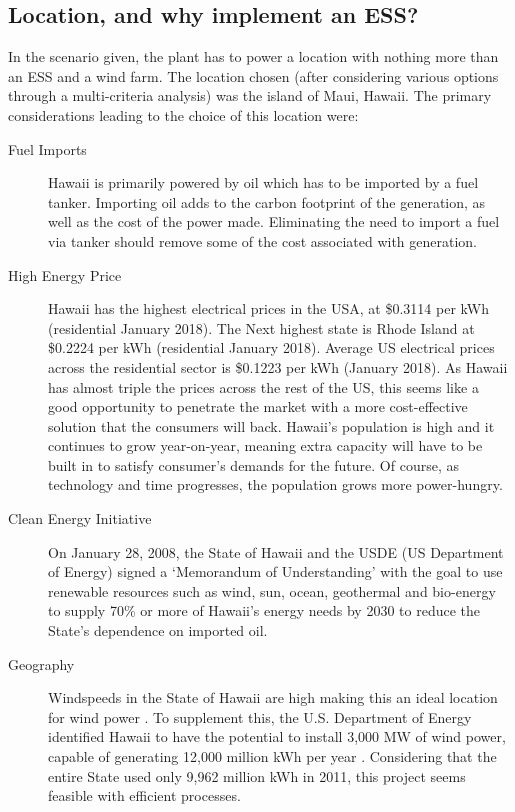 \subsection{Location, and why implement an ESS?}
In the scenario given, the plant has to power a location with nothing more than an ESS and a wind farm.
The location chosen (after considering various options through a multi-criteria analysis) was the island of Maui, Hawaii.
The primary considerations leading to the choice of this location were:
\begin{description}
        \item[Fuel Imports]{Hawaii is primarily powered by oil \cite{intro:oilimport} which has to be imported by a fuel tanker. Importing oil adds to the carbon footprint of the generation, as well as the cost of the power made. Eliminating the need to import a fuel via tanker should remove some of the cost associated with generation.}
        \item[High Energy Price]{Hawaii has the highest electrical prices in the USA, at \$0.3114 per kWh (residential January 2018)\cite{intro:price}. The Next highest state is Rhode Island at \$0.2224 per kWh (residential January 2018)\cite{intro:price}. Average US electrical prices across the residential sector is \$0.1223 per kWh (January 2018)\cite{intro:price}. As Hawaii has almost triple the prices across the rest of the US, this seems like a good opportunity to penetrate the market with a more cost-effective solution that the consumers will back.
Hawaii's population is high and it continues to grow year-on-year, meaning extra capacity will have to be built in to satisfy consumer's demands for the future. Of course, as technology and time progresses, the population grows more power-hungry.}
        \item[Clean Energy Initiative]{On January 28, 2008, the State of Hawaii and the USDE (US Department of Energy) signed a `Memorandum of Understanding' with the goal to use renewable resources such as wind, sun, ocean, geothermal and bio-energy to supply 70\% or more of Hawaii's energy needs by 2030 to reduce the State's dependence on imported oil.}
        \item[Geography]{Windspeeds in the State of Hawaii are high making this an ideal location for wind power \cite{intro:windspeed}. To supplement this, the U.S. Department of Energy identified Hawaii to have the potential to install 3,000 MW of wind power, capable of generating 12,000 million kWh per year \cite{intro:energy}.
Considering that the entire State used only 9,962 million kWh in 2011, this project seems feasible with efficient processes.}
\end{description}



